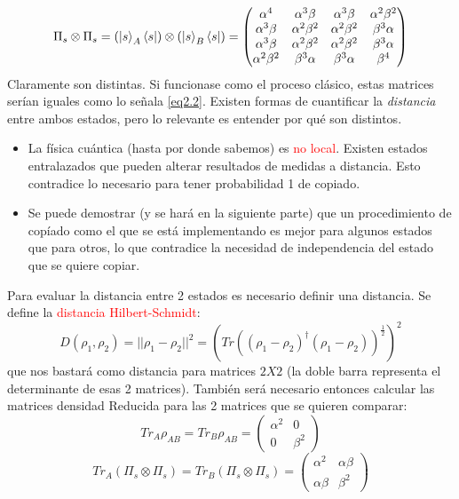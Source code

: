 \documentclass{book}
\begin{document}
\begin{equation}\label{eq2.8}{\Pi_s\otimes\Pi_s=(\ket{s}_A\bra{s})\otimes(\ket{s}_B\bra{s})=\begin{pmatrix} 
\alpha^4 & \alpha^3\beta & \alpha^3\beta& \alpha^2\beta^2 \\ \alpha^3\beta & \alpha^2\beta^2& \alpha^2\beta^2& \beta^3\alpha \\ \alpha^3\beta & \alpha^2\beta^2 & \alpha^2\beta^2 & \beta^3\alpha \\ \alpha^2\beta^2 & \beta^3\alpha& \beta^3\alpha & \beta^4 \end{pmatrix}}\end{equation}
Claramente son distintas. Si funcionase como el proceso clásico, estas matrices serían iguales como lo señala \textcolor{blue}{\ref{eq2.2}}. Existen formas de cuantificar la \textit{distancia} entre ambos estados, pero lo relevante es entender por qué son distintos.
\begin{itemize}
    \item La física cuántica (hasta por donde sabemos) es \textcolor{Red}{no local}. Existen estados entralazados que pueden alterar resultados de medidas a distancia. Esto contradice lo necesario para tener probabilidad 1 de copiado.
    \item Se puede demostrar (y se hará en la siguiente parte) que un procedimiento de copíado como el que se está implementando es mejor para algunos estados que para otros, lo que contradice la necesidad de independencia del estado que se quiere copiar.
\end{itemize}
Para evaluar la distancia entre 2 estados es necesario definir una distancia. Se define la \textcolor{red}{distancia Hilbert-Schmidt}:
\begin{equation}\label{eq2.9}{D(\rho_1,\rho_2)=\lvert\lvert\rho_1-\rho_2\rvert\rvert^2=(Tr((\rho_1-\rho_2)^\dag(\rho_1-\rho_2))^\frac{1}{2})^2}\end{equation} que nos bastará como distancia para matrices $2X2$ (la doble barra representa el determinante de esas 2 matrices).
También será necesario entonces calcular las matrices densidad Reducida para las 2 matrices que se quieren comparar:
\begin{equation}\label{eq2.10}{Tr_A\rho_{AB}=Tr_B\rho_{AB}=\begin{pmatrix}\alpha^2&0\\ 0&\beta^2\end{pmatrix}}\end{equation}
\begin{equation}\label{eq2.11}{Tr_A(\Pi_s\otimes\Pi_s)=Tr_B(\Pi_s\otimes\Pi_s)=\begin{pmatrix}\alpha^2 & \alpha\beta \\ \alpha\beta & \beta^2\end{pmatrix}}\end{equation}
\end{document}
